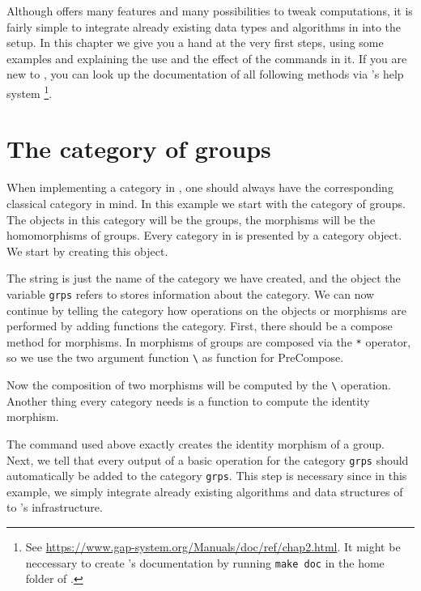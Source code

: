 Although \CapPkg offers many features and many possibilities to tweak computations,
it is fairly simple to integrate already existing data types and algorithms in \GAP
into the \CapPkg setup. In this chapter we give you a hand at the very first steps, using some
examples and explaining the use and the effect of the commands in it.
If you are new to \GAP, you can look up the documentation of all following 
methods via \GAP's help system 
\footnote{See \href{https://www.gap-system.org/Manuals/doc/ref/chap2.html}{https://www.gap-system.org/Manuals/doc/ref/chap2.html}. 
It might be neccessary to create \CapPkg's documentation by running \texttt{make doc} in the home folder of \CapPkg.}.

\section{The category of groups}\label{section:groups}

When implementing a category in \CapPkg, one should always have the corresponding classical
category in mind. In this example we start with the category of groups. The objects in this
category will be the groups, the morphisms will be the homomorphisms of groups. Every category
in \CapPkg is presented by a category \GAP object. We start by creating this object.



The string is just the name of the category we have created, and the object the variable
\texttt{grps} refers to stores information about the category. We can now continue by
telling the category how operations on the objects or morphisms are performed by adding
functions the category. First, there should be a compose method for morphisms. In \GAP
morphisms of groups are composed via the \texttt{*} operator, so we use the two
argument function \texttt{\textbackslash *} as function for \textrm{PreCompose}.



Now the composition of two morphisms will be computed by the \texttt{\textbackslash *} operation.
Another thing every category needs is a function to compute the identity morphism.



The command used above exactly creates the identity morphism of a group.
Next, we tell \CapPkg that every output of a basic operation for the category \texttt{grps} should automatically be added to the category \texttt{grps}.
This step is necessary since in this example, we simply integrate already existing algorithms and data structures of \GAP to
\CapPkg's infrastructure.

